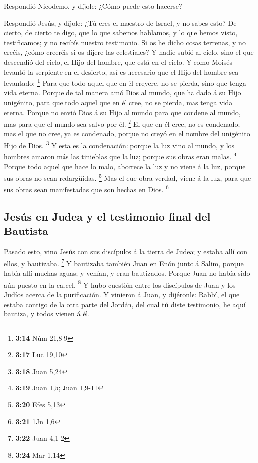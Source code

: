  Respondió Nicodemo, y díjole: ¿Cómo puede esto hacerse?

 Respondió Jesús, y díjole: ¿Tú eres el maestro de Israel,
y no sabes esto?  De cierto, de cierto te digo, que lo que
sabemos hablamos, y lo que hemos visto, testificamos; y no recibís
nuestro testimonio.  Si os he dicho cosas terrenas, y no
creéis, ¿cómo creeréis si os dijere las celestiales?  Y
nadie subió al cielo, sino el que descendió del cielo, el Hijo del
hombre, que está en el cielo.  Y como Moisés levantó la
serpiente en el desierto, así es necesario que el Hijo del hombre sea
levantado; \footnote{\textbf{3:14} Núm 21,8-9}  Para que
todo aquel que en él creyere, no se pierda, sino que tenga vida eterna.
 Porque de tal manera amó Dios al mundo, que ha dado á su
Hijo unigénito, para que todo aquel que en él cree, no se pierda, mas
tenga vida eterna.  Porque no envió Dios á su Hijo al mundo
para que condene al mundo, mas para que el mundo sea salvo por él.
\footnote{\textbf{3:17} Luc 19,10}  El que en él cree, no
es condenado; mas el que no cree, ya es condenado, porque no creyó en el
nombre del unigénito Hijo de Dios. \footnote{\textbf{3:18} Juan 5,24}
 Y esta es la condenación: porque la luz vino al mundo, y
los hombres amaron más las tinieblas que la luz; porque sus obras eran
malas. \footnote{\textbf{3:19} Juan 1,5; Juan 1,9-11} 
Porque todo aquel que hace lo malo, aborrece la luz y no viene á la luz,
porque sus obras no sean redargüidas. \footnote{\textbf{3:20} Efes 5,13}
 Mas el que obra verdad, viene á la luz, para que sus obras
sean manifestadas que son hechas en Dios. \footnote{\textbf{3:21} 1Jn
  1,6}

\hypertarget{jesuxfas-en-judea-y-el-testimonio-final-del-bautista}{%
\subsection{Jesús en Judea y el testimonio final del
Bautista}\label{jesuxfas-en-judea-y-el-testimonio-final-del-bautista}}

 Pasado esto, vino Jesús con sus discípulos á la tierra de
Judea; y estaba allí con ellos, y bautizaba. \footnote{\textbf{3:22}
  Juan 4,1-2}  Y bautizaba también Juan en Enón junto á
Salim, porque había allí muchas aguas; y venían, y eran bautizados.
 Porque Juan no había sido aún puesto en la carcel.
\footnote{\textbf{3:24} Mar 1,14}  Y hubo cuestión entre
los discípulos de Juan y los Judíos acerca de la purificación.
 Y vinieron á Juan, y dijéronle: Rabbí, el que estaba
contigo de la otra parte del Jordán, del cual tú diste testimonio, he
aquí bautiza, y todos vienen á él.


